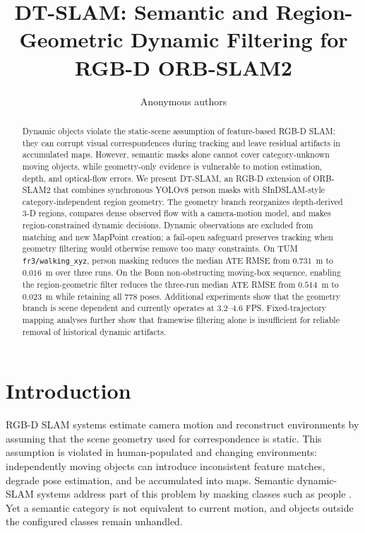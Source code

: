 \documentclass[10pt]{article}
\title{DT-SLAM: Semantic and Region-Geometric Dynamic Filtering for RGB-D ORB-SLAM2}
\author{Anonymous authors}
\date{}
\begin{document}
\maketitle

\begin{abstract}
Dynamic objects violate the static-scene assumption of feature-based RGB-D SLAM: they can corrupt visual correspondences during tracking and leave residual artifacts in accumulated maps. However, semantic masks alone cannot cover category-unknown moving objects, while geometry-only evidence is vulnerable to motion estimation, depth, and optical-flow errors. We present DT-SLAM, an RGB-D extension of ORB-SLAM2 that combines synchronous YOLOv8 person masks with SInDSLAM-style category-independent region geometry. The geometry branch reorganizes depth-derived 3-D regions, compares dense observed flow with a camera-motion model, and makes region-constrained dynamic decisions. Dynamic observations are excluded from matching and new MapPoint creation; a fail-open safeguard preserves tracking when geometry filtering would otherwise remove too many constraints. On TUM \texttt{fr3/walking\_xyz}, person masking reduces the median ATE RMSE from $0.731$~m to $0.016$~m over three runs. On the Bonn non-obstructing moving-box sequence, enabling the region-geometric filter reduces the three-run median ATE RMSE from $0.514$~m to $0.023$~m while retaining all 778 poses. Additional experiments show that the geometry branch is scene dependent and currently operates at 3.2--4.6 FPS. Fixed-trajectory mapping analyses further show that framewise filtering alone is insufficient for reliable removal of historical dynamic artifacts.
\end{abstract}

\section{Introduction}

RGB-D SLAM systems estimate camera motion and reconstruct environments by assuming that the scene geometry used for correspondence is static. This assumption is violated in human-populated and changing environments: independently moving objects can introduce inconsistent feature matches, degrade pose estimation, and be accumulated into maps. Semantic dynamic-SLAM systems address part of this problem by masking classes such as people \citep{dynaslam,dgs,ji2021}. Yet a semantic category is not equivalent to current motion, and objects outside the configured classes remain unhandled.
\end{document}
